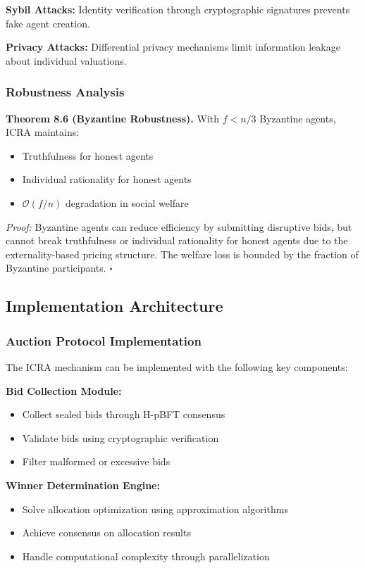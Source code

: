 \documentclass[conference]{IEEEtran}
\newcommand{\bigO}{\mathcal{O}}
\begin{document}
\textbf{Sybil Attacks:} Identity verification through cryptographic signatures prevents fake agent creation.

\textbf{Privacy Attacks:} Differential privacy mechanisms limit information leakage about individual valuations.

\subsubsection{Robustness Analysis}

\textbf{Theorem 8.6 (Byzantine Robustness).} With $f < n/3$ Byzantine agents, ICRA maintains:
\begin{itemize}
    \item Truthfulness for honest agents
    \item Individual rationality for honest agents
    \item $\bigO(f/n)$ degradation in social welfare
\end{itemize}

\textit{Proof:} Byzantine agents can reduce efficiency by submitting disruptive bids, but cannot break truthfulness or individual rationality for honest agents due to the externality-based pricing structure. The welfare loss is bounded by the fraction of Byzantine participants. $\square$

\subsection{Implementation Architecture}

\subsubsection{Auction Protocol Implementation}

The ICRA mechanism can be implemented with the following key components:

\textbf{Bid Collection Module:}
\begin{itemize}
    \item Collect sealed bids through H-pBFT consensus
    \item Validate bids using cryptographic verification
    \item Filter malformed or excessive bids
\end{itemize}

\textbf{Winner Determination Engine:}
\begin{itemize}
    \item Solve allocation optimization using approximation algorithms
    \item Achieve consensus on allocation results
    \item Handle computational complexity through parallelization
\end{itemize}
\end{document}
